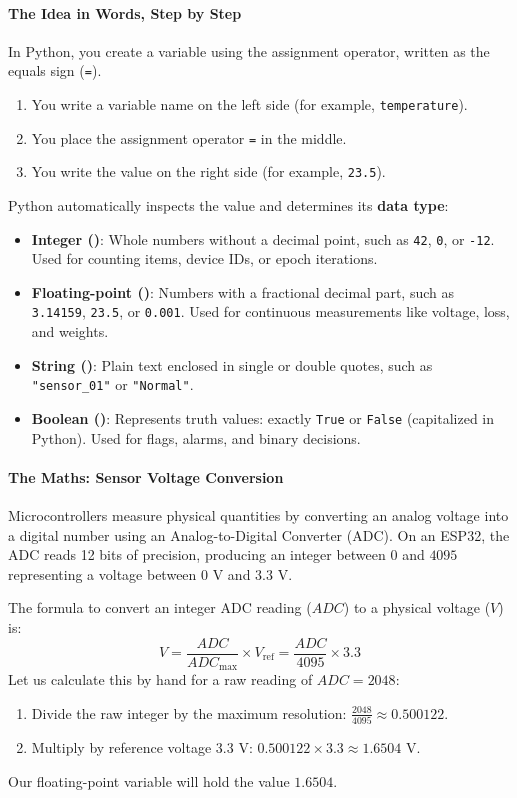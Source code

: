 \paragraph{The Idea in Words, Step by Step}
In Python, you create a variable using the assignment operator, written as the equals sign (\texttt{=}).
\begin{enumerate}
    \item You write a variable name on the left side (for example, \texttt{temperature}).
    \item You place the assignment operator \texttt{=} in the middle.
    \item You write the value on the right side (for example, \texttt{23.5}).
\end{enumerate}
Python automatically inspects the value and determines its \textbf{data type}:
\begin{itemize}
    \item \textbf{Integer ()}: Whole numbers without a decimal point, such as \texttt{42}, \texttt{0}, or \texttt{-12}. Used for counting items, device IDs, or epoch iterations.
    \item \textbf{Floating-point ()}: Numbers with a fractional decimal part, such as \texttt{3.14159}, \texttt{23.5}, or \texttt{0.001}. Used for continuous measurements like voltage, loss, and weights.
    \item \textbf{String ()}: Plain text enclosed in single or double quotes, such as \texttt{"sensor\_01"} or \texttt{"Normal"}.
    \item \textbf{Boolean ()}: Represents truth values: exactly \texttt{True} or \texttt{False} (capitalized in Python). Used for flags, alarms, and binary decisions.
\end{itemize}

\paragraph{The Maths: Sensor Voltage Conversion}
Microcontrollers measure physical quantities by converting an analog voltage into a digital number using an Analog-to-Digital Converter (ADC). On an ESP32, the ADC reads 12 bits of precision, producing an integer between $0$ and $4095$ representing a voltage between $0\text{ V}$ and $3.3\text{ V}$.

The formula to convert an integer ADC reading ($ADC$) to a physical voltage ($V$) is:
\begin{equation}
V = \frac{ADC}{ADC_{\max}} \times V_{\text{ref}} = \frac{ADC}{4095} \times 3.3\label{eq:adc_conversion}
\end{equation}
Let us calculate this by hand for a raw reading of $ADC = 2048$:
\begin{enumerate}
    \item Divide the raw integer by the maximum resolution: $\frac{2048}{4095} \approx 0.500122$.
    \item Multiply by reference voltage $3.3\text{ V}$: $0.500122 \times 3.3 \approx 1.6504\text{ V}$.
\end{enumerate}
Our floating-point variable will hold the value $1.6504$.

